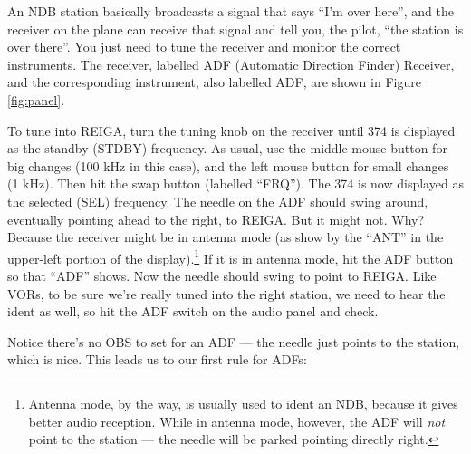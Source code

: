 An NDB station basically broadcasts a signal that says ``I'm over
here'', and the receiver on the plane can receive that signal and tell
you, the pilot, ``the station is over there''.  You just need to tune
the receiver and monitor the correct instruments.  The receiver,
labelled ADF (Automatic Direction Finder) Receiver, and the
corresponding instrument, also labelled ADF, are shown in Figure
\ref{fig:panel}.

To tune into REIGA, turn the tuning knob on the receiver until 374 is
displayed as the standby (STDBY) frequency.  As usual, use the middle mouse button for
big changes (100 kHz in this case), and the left mouse button for
small changes (1 kHz).  Then hit the swap button (labelled ``FRQ'').
The 374 is now displayed as the selected (SEL) frequency.  The needle
on the ADF should swing around, eventually pointing ahead to the
right, to REIGA.  But it might not.  Why?  Because the receiver might
be in antenna mode (as show by the ``ANT'' in the upper-left portion
of the display).\footnote{Antenna mode, by the way, is usually used to
  ident an NDB, because it gives better audio reception.  While in
  antenna mode, however, the ADF will \emph{not} point to the station
  --- the needle will be parked pointing directly right.}  If it is in
antenna mode, hit the ADF button so that ``ADF'' shows.  Now the
needle should swing to point to REIGA.  Like VORs, to be sure we're
really tuned into the right station, we need to hear the ident as
well, so hit the ADF switch on the audio panel and check.


Notice there's no OBS to set for an ADF --- the needle just points to
the station, which is nice.  This leads us to our first rule for ADFs:

